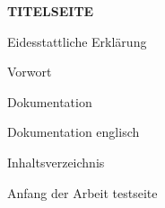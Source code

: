 \documentclass[twoside]{report}
\begin{document}
        \begin{titlepage}
            \textbf{TITELSEITE}
        \end{titlepage}

        \thispagestyle{empty}
        \cleardoublepage

        Eidesstattliche Erklärung
        \newpage

        Vorwort
        \newpage
    
        Dokumentation
        \newpage

        Dokumentation englisch
        \newpage

        Inhaltsverzeichnis
        \newpage

        \thispagestyle{empty}
        \cleardoublepage

        \setcounter{page}{1} %

        Anfang der Arbeit
        \newpage
        testseite


    
\end{document}
